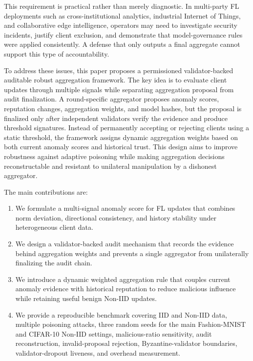 \documentclass[preprint,authoryear,12pt]{elsarticle}
\begin{document}
This requirement is practical rather than merely diagnostic. In multi-party FL deployments such as cross-institutional analytics, industrial Internet of Things, and collaborative edge intelligence, operators may need to investigate security incidents, justify client exclusion, and demonstrate that model-governance rules were applied consistently. A defense that only outputs a final aggregate cannot support this type of accountability.

To address these issues, this paper proposes a permissioned validator-backed auditable robust aggregation framework. The key idea is to evaluate client updates through multiple signals while separating aggregation proposal from audit finalization. A round-specific aggregator proposes anomaly scores, reputation changes, aggregation weights, and model hashes, but the proposal is finalized only after independent validators verify the evidence and produce threshold signatures. Instead of permanently accepting or rejecting clients using a static threshold, the framework assigns dynamic aggregation weights based on both current anomaly scores and historical trust. This design aims to improve robustness against adaptive poisoning while making aggregation decisions reconstructable and resistant to unilateral manipulation by a dishonest aggregator.

The main contributions are:
\begin{enumerate}
  \item We formulate a multi-signal anomaly score for FL updates that combines norm deviation, directional consistency, and history stability under heterogeneous client data.
  \item We design a validator-backed audit mechanism that records the evidence behind aggregation weights and prevents a single aggregator from unilaterally finalizing the audit chain.
  \item We introduce a dynamic weighted aggregation rule that couples current anomaly evidence with historical reputation to reduce malicious influence while retaining useful benign Non-IID updates.
  \item We provide a reproducible benchmark covering IID and Non-IID data, multiple poisoning attacks, three random seeds for the main Fashion-MNIST and CIFAR-10 Non-IID settings, malicious-ratio sensitivity, audit reconstruction, invalid-proposal rejection, Byzantine-validator boundaries, validator-dropout liveness, and overhead measurement.
\end{enumerate}
\end{document}
